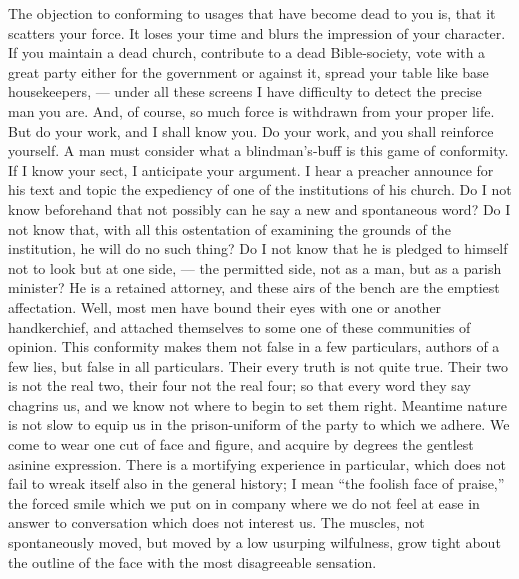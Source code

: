 \documentclass{article}
\begin{document}
The objection to conforming to usages that have become dead to you is, that
it scatters your force. It loses your time and blurs the impression of your
character. If you maintain a dead church, contribute to a dead
Bible-society, vote with a great party either for the government or against
it, spread your table like base housekeepers, --- under all these screens I
have difficulty to detect the precise man you are. And, of course, so much
force is withdrawn from your proper life. But do your work, and I shall know
you. Do your work, and you shall reinforce yourself. A man must consider
what a blindman's-buff is this game of conformity. If I know your sect, I
anticipate your argument. I hear a preacher announce for his text and topic
the expediency of one of the institutions of his church. Do I not know
beforehand that not possibly can he say a new and spontaneous word? Do I not
know that, with all this ostentation of examining the grounds of the
institution, he will do no such thing? Do I not know that he is pledged to
himself not to look but at one side, --- the permitted side, not as a man,
but as a parish minister? He is a retained attorney, and these airs of the
bench are the emptiest affectation. Well, most men have bound their eyes
with one or another handkerchief, and attached themselves to some one of
these communities of opinion. This conformity makes them not false in a few
particulars, authors of a few lies, but false in all particulars. Their
every truth is not quite true. Their two is not the real two, their four not
the real four; so that every word they say chagrins us, and we know not
where to begin to set them right. Meantime nature is not slow to equip us in
the prison-uniform of the party to which we adhere. We come to wear one cut
of face and figure, and acquire by degrees the gentlest asinine expression.
There is a mortifying experience in particular, which does not fail to wreak
itself also in the general history; I mean ``the foolish face of praise,'' the
forced smile which we put on in company where we do not feel at ease in
answer to conversation which does not interest us. The muscles, not
spontaneously moved, but moved by a low usurping wilfulness, grow tight
about the outline of the face with the most disagreeable sensation.
\end{document}
